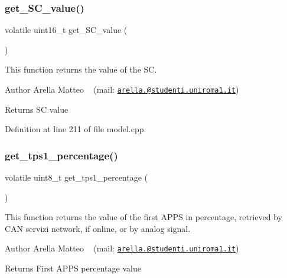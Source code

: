 \subsubsection{\texorpdfstring{get\+\_\+\+S\+C\+\_\+value()}{get\_SC\_value()}}
{\footnotesize\ttfamily volatile uint16\+\_\+t get\+\_\+\+S\+C\+\_\+value (\begin{DoxyParamCaption}{ }\end{DoxyParamCaption})}



This function returns the value of the SC. 

\begin{DoxyAuthor}{Author}
Arella Matteo ~\newline
 (mail\+: \href{mailto:arella.1646983@studenti.uniroma1.it}{\tt arella.@studenti.\+uniroma1.\+it})
\end{DoxyAuthor}
\begin{DoxyReturn}{Returns}
SC value 
\end{DoxyReturn}


Definition at line 211 of file model.\+cpp.

\mbox{\label{group___board__model__group_ga9239a95f68fab3d9b6832fbe85eb87cd}} 
\subsubsection{\texorpdfstring{get\+\_\+tps1\+\_\+percentage()}{get\_tps1\_percentage()}}
{\footnotesize\ttfamily volatile uint8\+\_\+t get\+\_\+tps1\+\_\+percentage (\begin{DoxyParamCaption}{ }\end{DoxyParamCaption})}



This function returns the value of the first A\+P\+PS in percentage, retrieved by C\+AN servizi network, if online, or by analog signal. 

\begin{DoxyAuthor}{Author}
Arella Matteo ~\newline
 (mail\+: \href{mailto:arella.1646983@studenti.uniroma1.it}{\tt arella.@studenti.\+uniroma1.\+it})
\end{DoxyAuthor}
\begin{DoxyReturn}{Returns}
First A\+P\+PS percentage value 
\end{DoxyReturn}


